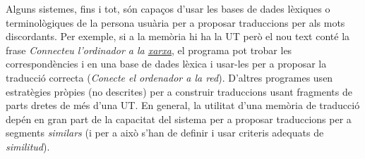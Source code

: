 Alguns sistemes, fins i tot, són capaços d'usar les bases de dades
lèxiques o terminològiques de la persona usuària per a proposar
traduccions per als mots discordants.  Per exemple, si a la memòria hi
ha la UT  però el
nou text conté la frase \emph{Connecteu l'ordinador a la
  \underline{xarxa}}, el programa pot trobar les correspondències
 i
 en una base de dades lèxica
i usar-les per a proposar la traducció correcta (\emph{Conecte el
  ordenador a la red}).  D'altres programes usen estratègies pròpies
(no descrites) per a construir traduccions usant fragments de parts
dretes de més d'una UT.  En general, la utilitat d'una memòria de
traducció depén en gran part de la capacitat del sistema per a
proposar traduccions per a segments \emph{similars} (i per a això
s'han de definir i usar criteris adequats de \emph{similitud}).

